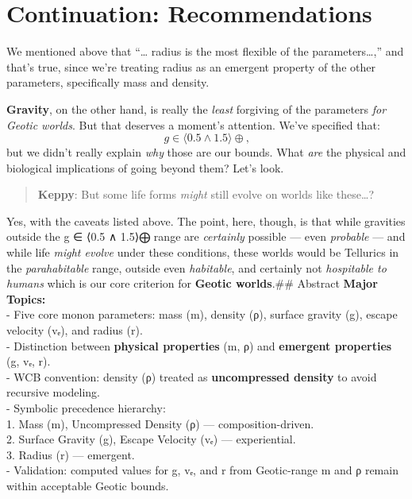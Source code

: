 \documentclass[
  letterpaper,
]{book}
\begin{document}
\chapter{Continuation:
Recommendations}\label{continuation-recommendations}

We mentioned above that ``\ldots{} radius is the most flexible of the
parameters\ldots,'' and that's true, since we're treating radius as an
emergent property of the other parameters, specifically mass and
density.

\textbf{Gravity}, on the other hand, is really the \emph{least}
forgiving of the parameters \emph{for Geotic worlds}. But that deserves
a moment's attention. We've specified that:
\[g \in \langle0.5 \wedge 1.5\rangle\oplus\text{,}\] but we didn't
really explain \emph{why} those are our bounds. What \emph{are} the
physical and biological implications of going beyond them? Let's look.

\begin{quote}
\textbf{Keppy}: But some life forms \emph{might} still evolve on worlds
like these\ldots?
\end{quote}

Yes, with the caveats listed above. The point, here, though, is that
while gravities outside the g ∈ ⟨0.5 ∧ 1.5⟩⨁ range are \emph{certainly}
possible --- even \emph{probable} --- and while life \emph{might evolve}
under these conditions, these worlds would be Tellurics in the
\emph{parahabitable} range, outside even \emph{habitable}, and certainly
not \emph{hospitable to humans} which is our core criterion for
\textbf{Geotic worlds}.\#\# Abstract \textbf{Major Topics:}\\
- Five core monon parameters: mass (m), density (ρ), surface gravity
(g), escape velocity (vₑ), and radius (r).\\
- Distinction between \textbf{physical properties} (m, ρ) and
\textbf{emergent properties} (g, vₑ, r).\\
- WCB convention: density (ρ) treated as \textbf{uncompressed density}
to avoid recursive modeling.\\
- Symbolic precedence hierarchy:\\
1. Mass (m), Uncompressed Density (ρ) --- composition-driven.\\
2. Surface Gravity (g), Escape Velocity (vₑ) --- experiential.\\
3. Radius (r) --- emergent.\\
- Validation: computed values for g, vₑ, and r from Geotic-range m and ρ
remain within acceptable Geotic bounds.
\end{document}
